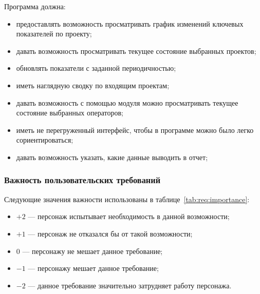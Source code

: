 Программа должна:
\begin{itemize}
    \item предоставлять возможность просматривать график изменений ключевых показателей по проекту;
    \item давать возможность просматривать текущее состояние выбранных проектов;
    \item обновлять показатели с заданной периодичностью;
    \item иметь наглядную сводку по входящим проектам;
    \item давать возможность с помощью модуля можно просматривать текущее состояние выбранных операторов;
    \item иметь не перегруженный интерфейс, чтобы в программе можно было легко сориентироваться;
    \item давать возможность указать, какие данные выводить в отчет;
\end{itemize}

\subsubsection{Важность пользовательских требований}

Следующие значения важности использованы в таблице~\ref{tab:req:importance}:
\begin{itemize}
    \item $+2$ --- персонаж испытывает необходимость в данной возможности;
    \item $+1$ --- персонаж не отказался бы от такой возможности;
    \item $0$ --- персонажу не мешает данное требование;
    \item $-1$ --- персонажу мешает данное требование;
    \item $-2$ --- данное требование значительно затрудняет работу персонажа.
\end{itemize}

